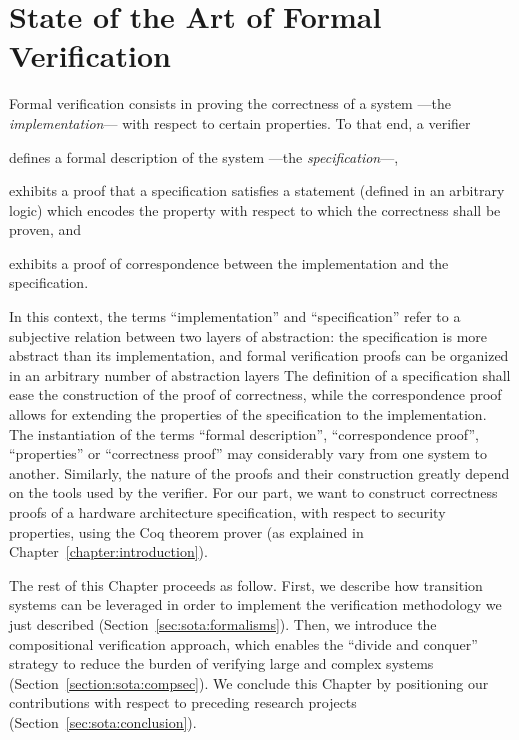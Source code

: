\chapter{State of the Art of Formal Verification}
\label{chapter:relatedwork}


\vspace{1cm}\noindent
%
Formal verification consists in proving the correctness of a system ---the
\emph{implementation}--- with respect to certain properties.
%
To that end, a verifier
%
\begin{inparaenum}[(1)]
\item defines a formal description of the system ---the \emph{specification}---,
\item exhibits a proof that a specification satisfies a statement (defined in an
  arbitrary logic) which encodes the property with respect to which the
  correctness shall be proven, and
\item exhibits a proof of correspondence between the implementation and the
  specification.
\end{inparaenum}
%
In this context, the terms ``implementation'' and ``specification'' refer to a
subjective relation between two layers of abstraction: the specification is more
abstract than its implementation, and formal verification proofs can be
organized in an arbitrary number of abstraction layers
%
The definition of a specification shall ease the construction of the proof of
correctness, while the correspondence proof allows for extending the properties
of the specification to the implementation.
%
The instantiation of the terms ``formal description'', ``correspondence proof'',
``properties'' or ``correctness proof'' may considerably vary from one system to
another.
%
Similarly, the nature of the proofs and their construction greatly depend on the
tools used by the verifier.
%
For our part, we want to construct correctness proofs of a hardware architecture
specification, with respect to security properties, using the Coq theorem prover
(as explained in Chapter~\ref{chapter:introduction}).

The rest of this Chapter proceeds as follow.
%
First, we describe how transition systems can be leveraged in order to implement
the verification methodology we just described
(Section~\ref{sec:sota:formalisms}).
%
Then, we introduce the compositional verification approach, which enables the
``divide and conquer'' strategy to reduce the burden of verifying large and
complex systems (Section~\ref{section:sota:compsec}).
%
We conclude this Chapter by positioning our contributions with respect to
preceding research projects (Section~\ref{sec:sota:conclusion}).

